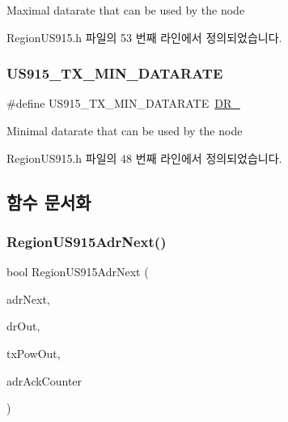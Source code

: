Maximal datarate that can be used by the node 

Region\+U\+S915.\+h 파일의 53 번째 라인에서 정의되었습니다.

\mbox{\label{group___r_e_g_i_o_n_u_s915_ga82ad1f3ace520fc55727e442784bdcb6}} 
\subsubsection{\texorpdfstring{U\+S915\+\_\+\+T\+X\+\_\+\+M\+I\+N\+\_\+\+D\+A\+T\+A\+R\+A\+TE}{US915\_TX\_MIN\_DATARATE}}
{\footnotesize\ttfamily \#define U\+S915\+\_\+\+T\+X\+\_\+\+M\+I\+N\+\_\+\+D\+A\+T\+A\+R\+A\+TE~\mbox{\hyperlink{group___r_e_g_i_o_n_ga6c4ef966b4f3d5eb7597b087f2b97095}{D\+R\+\_}}}

Minimal datarate that can be used by the node 

Region\+U\+S915.\+h 파일의 48 번째 라인에서 정의되었습니다.



\subsection{함수 문서화}
\mbox{\label{group___r_e_g_i_o_n_u_s915_gaf76316af68c44cbbc44818e0a51cb4d6}} 
\subsubsection{\texorpdfstring{Region\+U\+S915\+Adr\+Next()}{RegionUS915AdrNext()}}
{\footnotesize\ttfamily bool Region\+U\+S915\+Adr\+Next (\begin{DoxyParamCaption}\item[{\mbox{\hyperlink{group___r_e_g_i_o_n_ga567c2742622326b350b4e91bbf61b4ce}{Adr\+Next\+Params\+\_\+t}} $\ast$}]{adr\+Next,  }\item[{int8\+\_\+t $\ast$}]{dr\+Out,  }\item[{int8\+\_\+t $\ast$}]{tx\+Pow\+Out,  }\item[{uint32\+\_\+t $\ast$}]{adr\+Ack\+Counter }\end{DoxyParamCaption})}



